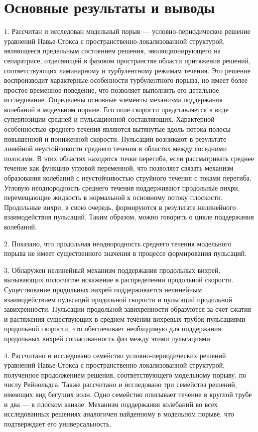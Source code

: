 
\section*{\centering Основные результаты и выводы}

\noindent $1.$ Рассчитан и исследован модельный порыв --- условно-периодическое решение уравнений Навье-Стокса с пространственно-локализованной структурой, являющееся предельным состоянием решения, эволюционирующего на сепаратрисе, отделяющей в фазовом пространстве области притяжения решений, соответствующих ламинарному и турбулентному режимам течения. Это решение воспроизводит характерные особенности турбулентного порыва, но имеет более простое временное поведение, что позволяет выполнить его детальное исследование. Определены основные элементы механизма поддержания колебаний в модельном порыве. Его поле скорости представляется в виде суперпозиции средней и пульсационной составляющих. Характерной особенностью среднего течения являются вытянутые вдоль потока полосы повышенной и пониженной скорости. Пульсации возникают в результате линейной неустойчивости среднего течения в областях между соседними полосами. В этих областях находятся точки перегиба, если рассматривать среднее течение как функцию угловой переменной, что позволяет связать механизм образования колебаний с неустойчивостью струйного течения с токами перегиба. Угловую неоднородность среднего течения поддерживают продольные вихри, перемещающие жидкость в нормальной к основному потоку плоскости. Продольные вихри, в свою очередь, формируются в результате нелинейного взаимодействия пульсаций. Таким образом, можно говорить о цикле поддержания колебаний. 

\noindent $2.$ Показано, что продольная неоднородность среднего течения модельного порыва не имеет существенного значения в процессе формирования пульсаций. 

\noindent $3.$ Обнаружен нелинейный механизм поддержания продольных вихрей, вызывающих полосчатое искажение в распределении продольной скорости. Существование продольных вихрей поддерживается нелинейным взаимодействием пульсаций продольной скорости и пульсаций продольной завихренности. Пульсации продольной завихренности образуются за счет сжатия и растяжения существующих в среднем течении вихревых трубок пульсациями продольной скорости, что обеспечивает необходимую для поддержания продольных вихрей согласованность фаз между этими пульсациями. 

\noindent $4.$ Рассчитано и исследовано семейство условно-периодических решений уравнений Навье-Стокса с пространственно локализованной структурой, полученное продолжением решения, соответствующего модельному порыву, по числу Рейнольдса. Также рассчитано и исследовано три семейства решений, имеющих вид бегущих волн. Одно семейство описывает течение в круглой трубе и два --- в плоском канале. Механизм поддержания колебаний во всех исследованных решениях аналогичен найденному в модельном порыве, что подтверждает его универсальность. 
